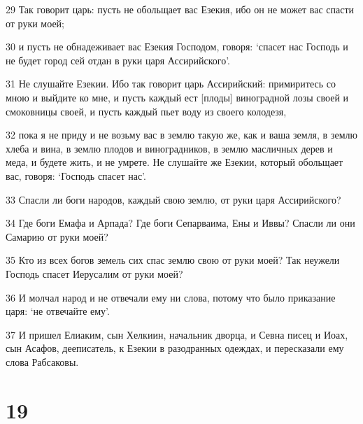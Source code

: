 \par 29 Так говорит царь: пусть не обольщает вас Езекия, ибо он не может вас спасти от руки моей;
\par 30 и пусть не обнадеживает вас Езекия Господом, говоря: `спасет нас Господь и не будет город сей отдан в руки царя Ассирийского'.
\par 31 Не слушайте Езекии. Ибо так говорит царь Ассирийский: примиритесь со мною и выйдите ко мне, и пусть каждый ест [плоды] виноградной лозы своей и смоковницы своей, и пусть каждый пьет воду из своего колодезя,
\par 32 пока я не приду и не возьму вас в землю такую же, как и ваша земля, в землю хлеба и вина, в землю плодов и виноградников, в землю масличных дерев и меда, и будете жить, и не умрете. Не слушайте же Езекии, который обольщает вас, говоря: `Господь спасет нас'.
\par 33 Спасли ли боги народов, каждый свою землю, от руки царя Ассирийского?
\par 34 Где боги Емафа и Арпада? Где боги Сепарваима, Ены и Иввы? Спасли ли они Самарию от руки моей?
\par 35 Кто из всех богов земель сих спас землю свою от руки моей? Так неужели Господь спасет Иерусалим от руки моей?
\par 36 И молчал народ и не отвечали ему ни слова, потому что было приказание царя: `не отвечайте ему'.
\par 37 И пришел Елиаким, сын Хелкиин, начальник дворца, и Севна писец и Иоах, сын Асафов, дееписатель, к Езекии в разодранных одеждах, и пересказали ему слова Рабсаковы.

\chapter{19}


